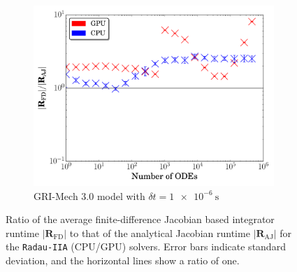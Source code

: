 \documentclass[preprint]{elsarticle}
\begin{document}
\begin{figure}[htb]
  \begin{subfigure}{0.49\textwidth}
      \includegraphics[width=\linewidth]{CH4_1e-06_ajac_comp.pdf}
      \caption{GRI-Mech 3.0 model with $\delta t = \SI{1e-6}{\second}$}
      \label{F:AJ_ch4_small}
  \end{subfigure}
  \caption{Ratio of the average finite-difference Jacobian based integrator runtime $\lvert\textbf{R}_{\text{FD}}\rvert$ to that of the analytical Jacobian runtime $\lvert\textbf{R}_{\text{AJ}}\rvert$ for the \texttt{Radau-IIA} (CPU\slash GPU) solvers.
  Error bars indicate standard deviation, and the horizontal lines show a ratio of one.}
  \label{F:AJ_comp}
\end{figure}

% 
\end{document}
